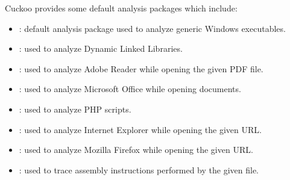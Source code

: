 \documentclass[letterpaper,10pt,english]{sphinxmanual}
\begin{document}
Cuckoo provides some default analysis packages which include:
\begin{itemize}
\item {} 
: default analysis package used to analyze generic Windows executables.

\item {} 
: used to analyze Dynamic Linked Libraries.

\item {} 
: used to analyze Adobe Reader while opening the given PDF file.

\item {} 
: used to analyze Microsoft Office while opening documents.

\item {} 
: used to analyze PHP scripts.

\item {} 
: used to analyze Internet Explorer while opening the given URL.

\item {} 
: used to analyze Mozilla Firefox while opening the given URL.

\item {} 
: used to trace assembly instructions performed by the given file.

\end{itemize}
\end{document}
